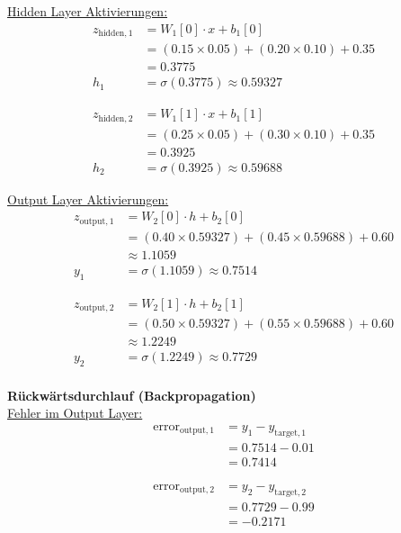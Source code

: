 \documentclass[12pt]{article}
\begin{document}
\underline{Hidden Layer Aktivierungen:}
\begin{align*}
z_{\text{hidden}, 1} &= W_1[0] \cdot x + b_1[0] \\
&= (0.15 \times 0.05) + (0.20 \times 0.10) + 0.35 \\
&= 0.3775 \\
h_1 &= \sigma(0.3775) \approx 0.59327
\end{align*}

\begin{align*}
z_{\text{hidden}, 2} &= W_1[1] \cdot x + b_1[1] \\
&= (0.25 \times 0.05) + (0.30 \times 0.10) + 0.35 \\
&= 0.3925 \\
h_2 &= \sigma(0.3925) \approx 0.59688
\end{align*}

\underline{Output Layer Aktivierungen:}
\begin{align*}
z_{\text{output}, 1} &= W_2[0] \cdot h + b_2[0] \\
&= (0.40 \times 0.59327) + (0.45 \times 0.59688) + 0.60 \\
&\approx 1.1059 \\
y_1 &= \sigma(1.1059) \approx 0.7514
\end{align*}

\begin{align*}
z_{\text{output}, 2} &= W_2[1] \cdot h + b_2[1] \\
&= (0.50 \times 0.59327) + (0.55 \times 0.59688) + 0.60 \\
&\approx 1.2249 \\
y_2 &= \sigma(1.2249) \approx 0.7729
\end{align*}\\[0.3cm]
%
%
\textbf{Rückwärtsdurchlauf (Backpropagation)}\\

\underline{Fehler im Output Layer:}
\begin{align*}
\text{error}_{\text{output}, 1} &= y_1 - y_{\text{target}, 1} \\
&= 0.7514 - 0.01 \\
&= 0.7414
\end{align*}

\begin{align*}
\text{error}_{\text{output}, 2} &= y_2 - y_{\text{target}, 2} \\
&= 0.7729 - 0.99 \\
&= -0.2171
\end{align*}
\end{document}
